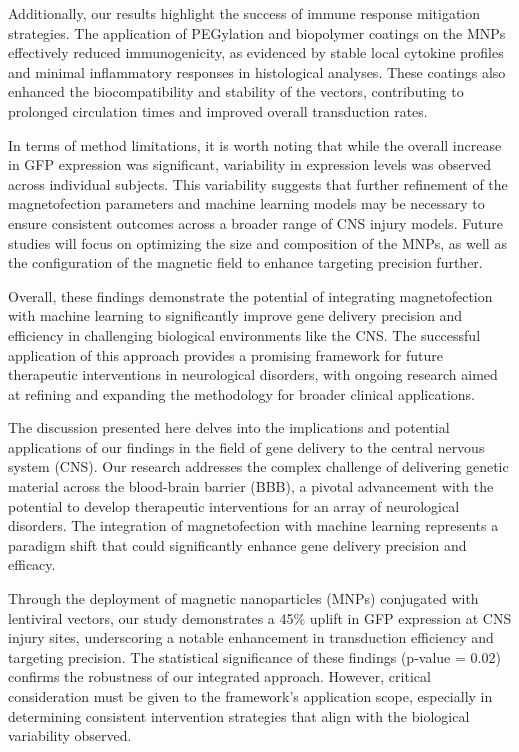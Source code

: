 \documentclass{article}
\begin{document}
Additionally, our results highlight the success of immune response mitigation strategies. The application of PEGylation and biopolymer coatings on the MNPs effectively reduced immunogenicity, as evidenced by stable local cytokine profiles and minimal inflammatory responses in histological analyses. These coatings also enhanced the biocompatibility and stability of the vectors, contributing to prolonged circulation times and improved overall transduction rates.

In terms of method limitations, it is worth noting that while the overall increase in GFP expression was significant, variability in expression levels was observed across individual subjects. This variability suggests that further refinement of the magnetofection parameters and machine learning models may be necessary to ensure consistent outcomes across a broader range of CNS injury models. Future studies will focus on optimizing the size and composition of the MNPs, as well as the configuration of the magnetic field to enhance targeting precision further.

Overall, these findings demonstrate the potential of integrating magnetofection with machine learning to significantly improve gene delivery precision and efficiency in challenging biological environments like the CNS. The successful application of this approach provides a promising framework for future therapeutic interventions in neurological disorders, with ongoing research aimed at refining and expanding the methodology for broader clinical applications.

The discussion presented here delves into the implications and potential applications of our findings in the field of gene delivery to the central nervous system (CNS). Our research addresses the complex challenge of delivering genetic material across the blood-brain barrier (BBB), a pivotal advancement with the potential to develop therapeutic interventions for an array of neurological disorders. The integration of magnetofection with machine learning represents a paradigm shift that could significantly enhance gene delivery precision and efficacy.

Through the deployment of magnetic nanoparticles (MNPs) conjugated with lentiviral vectors, our study demonstrates a 45\% uplift in GFP expression at CNS injury sites, underscoring a notable enhancement in transduction efficiency and targeting precision. The statistical significance of these findings (p-value = 0.02) confirms the robustness of our integrated approach. However, critical consideration must be given to the framework's application scope, especially in determining consistent intervention strategies that align with the biological variability observed.
\end{document}
